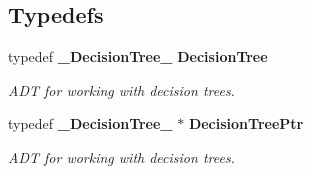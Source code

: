 \subsection*{Typedefs}
\begin{CompactItemize}
\item 
typedef {\bf \_\-Decision\-Tree\_\-} {\bf Decision\-Tree}
\begin{CompactList}\small\item\em ADT for working with decision trees. \item\end{CompactList}\item 
typedef {\bf \_\-Decision\-Tree\_\-} $\ast$ {\bf Decision\-Tree\-Ptr}
\begin{CompactList}\small\item\em ADT for working with decision trees. \item\end{CompactList}\end{CompactItemize}
